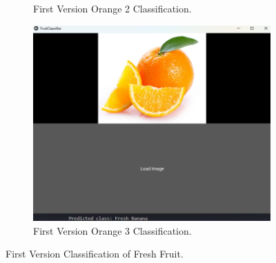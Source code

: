 \documentclass[conference]{IEEEtran}
\begin{document}
\begin{figure}[h]
\begin{subfigure}[b]{0.48\linewidth}
        \caption{First Version Orange 2 Classification.}
        \label{figFB}
    \end{subfigure}
    \hfill
    \begin{subfigure}[b]{0.48\linewidth}
        \centering
        \includegraphics[width=\linewidth]{1layer orage3.png}
        \caption{First Version Orange 3 Classification.}
        \label{figFB}
    \end{subfigure}
    \caption{First Version Classification of Fresh Fruit.}
    \label{Fig1F}
\end{figure}
\end{document}
